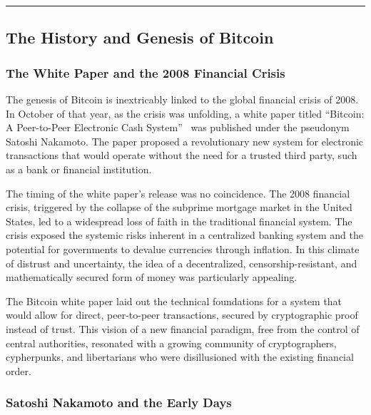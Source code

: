 \begin{center}\rule{0.5\linewidth}{0.5pt}\end{center}

\subsection{The History and Genesis of
	Bitcoin}\label{section-1-the-history-and-genesis-of-bitcoin}

\subsubsection{The White Paper and the 2008 Financial
	Crisis}\label{the-white-paper-and-the-2008-financial-crisis}

The genesis of Bitcoin is inextricably linked to the global financial
crisis of 2008. In October of that year, as the crisis was unfolding, a
white paper titled ``Bitcoin: A Peer-to-Peer Electronic Cash System''~\cite{nakamoto2008bitcoin}
was published under the pseudonym Satoshi Nakamoto. The paper proposed a
revolutionary new system for electronic transactions that would operate
without the need for a trusted third party, such as a bank or financial
institution.

The timing of the white paper's release was no coincidence. The 2008
financial crisis, triggered by the collapse of the subprime mortgage
market in the United States, led to a widespread loss of faith in the
traditional financial system. The crisis exposed the systemic risks
inherent in a centralized banking system and the potential for
governments to devalue currencies through inflation. In this climate of
distrust and uncertainty, the idea of a decentralized,
censorship-resistant, and mathematically secured form of money was
particularly appealing.

The Bitcoin white paper laid out the technical foundations for a system
that would allow for direct, peer-to-peer transactions, secured by
cryptographic proof instead of trust. This vision of a new financial
paradigm, free from the control of central authorities, resonated with a
growing community of cryptographers, cypherpunks, and libertarians who
were disillusioned with the existing financial order.

\subsubsection{Satoshi Nakamoto and the Early
	Days}\label{satoshi-nakamoto-and-the-early-days}

